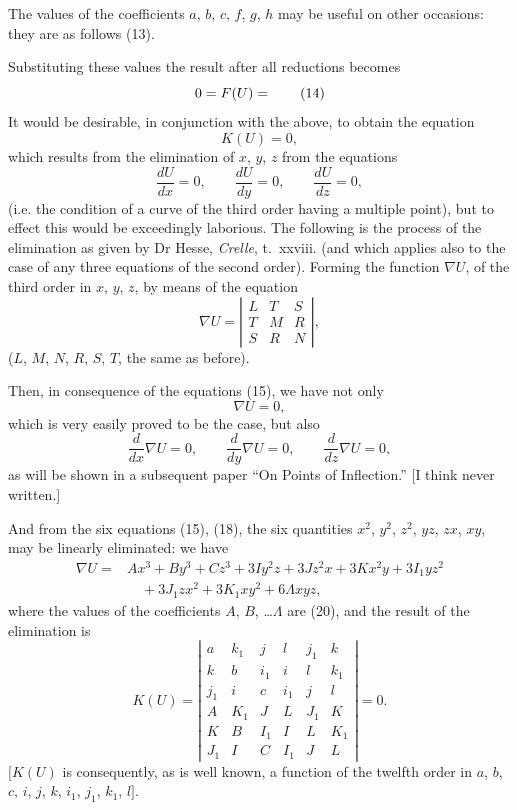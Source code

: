\documentclass[11pt]{article}
\begin{document}
The values of the coefficients $a$, $b$, $c$, $f$, $g$, $h$ may be useful on other
occasions: they are as follows \dotfill (13).

Substituting these values the result after all reductions becomes
\[
0=F(U)=\dotfill\tag{14}
\]
It would be desirable, in conjunction with the above, to obtain the equation
\[
K(U)=0,
\]
which results from the elimination of $x$, $y$, $z$ from the equations
\[
\frac{dU}{dx}=0,\qquad \frac{dU}{dy}=0,\qquad \frac{dU}{dz}=0,\tag{15}
\]
(i.e. the condition of a curve of the third order having a multiple point), but to effect
this would be exceedingly laborious. The following is the process of the elimination as
given by Dr Hesse, \textit{Crelle}, t.~xxviii. (and which applies also to the case of any
three equations of the second order). Forming the function $\nabla U$, of the third order
in $x$, $y$, $z$, by means of the equation
\[
\nabla U=\left|
\begin{array}{ccc}
L&T&S\\
T&M&R\\
S&R&N
\end{array}
\right|,\tag{16}
\]
($L$, $M$, $N$, $R$, $S$, $T$, the same as before).

Then, in consequence of the equations (15), we have not only
\[
\nabla U=0,\tag{17}
\]
which is very easily proved to be the case, but also
\[
\frac{d}{dx}\nabla U=0,\qquad
\frac{d}{dy}\nabla U=0,\qquad
\frac{d}{dz}\nabla U=0,\tag{18}
\]
as will be shown in a subsequent paper ``On Points of Inflection.'' [I think never
written.]

And from the six equations (15), (18), the six quantities $x^2$, $y^2$, $z^2$, $yz$, $zx$,
$xy$, may be linearly eliminated: we have
\[
\begin{aligned}
\nabla U={}&Ax^3+By^3+Cz^3+3Iy^2z+3Jz^2x+3Kx^2y+3I_1yz^2\\
&\quad{}+3J_1zx^2+3K_1xy^2+6\Lambda xyz,
\end{aligned}\tag{19}
\]
where the values of the coefficients $A$, $B$, \ldots $\Lambda$ are \dotfill (20),
and the result of the elimination is
\[
K(U)=\left|
\begin{array}{cccccc}
a&k_1&j&l&j_1&k\\
k&b&i_1&i&l&k_1\\
j_1&i&c&i_1&j&l\\
A&K_1&J&L&J_1&K\\
K&B&I_1&I&L&K_1\\
J_1&I&C&I_1&J&L
\end{array}
\right|=0.\tag{21}
\]
$[K(U)$ is consequently, as is well known, a function of the twelfth order in
$a$, $b$, $c$, $i$, $j$, $k$, $i_1$, $j_1$, $k_1$, $l]$.
\end{document}
